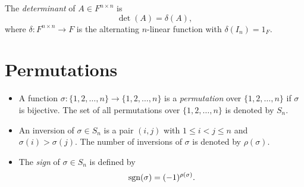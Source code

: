\begin{definition}
  The \emph{determinant} of $A \in F^{n \times n}$ is
  \begin{equation*}
    \det(A) = \delta(A),
  \end{equation*}
  where $\delta: F^{n \times n} \to F$ is the alternating $n$-linear function
  with $\delta(I_n) = 1_F$.
\end{definition}

\section{Permutations}
\begin{definition}
  \label{def:permutation}
  \leavevmode
  \begin{itemize}
    \item A function $\sigma: \{1, 2, \dots, n\} \to \{1, 2, \dots, n\}$
    is a \emph{permutation} over $\{1, 2, \dots, n\}$ if $\sigma$ is
    bijective. The set of all permutations over $\{1, 2, \dots, n\}$ is denoted
    by $S_n$.
    \item An inversion of $\sigma \in S_n$ is a pair $(i, j)$ with
    $1 \leq i < j \leq n$ and $\sigma(i) > \sigma(j)$.
    The number of inversions of $\sigma$ is denoted by $\rho(\sigma)$.
    \item The \emph{sign} of $\sigma \in S_n$ is defined by
    \begin{equation*}
      \operatorname{sgn}(\sigma) = (-1)^{\rho(\sigma)}.
    \end{equation*}
  \end{itemize}
\end{definition}

